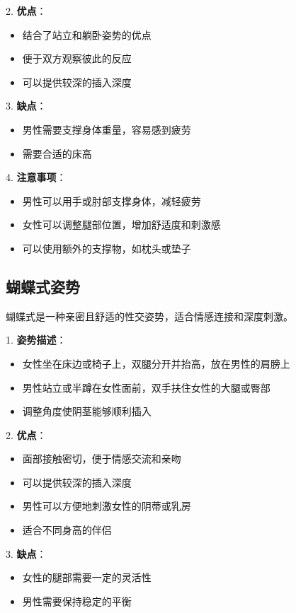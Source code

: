 \documentclass[12pt,UTF8]{ctexbook}
\begin{document}
2. \textbf{优点}：
  \begin{itemize}
  \item 结合了站立和躺卧姿势的优点
  \item 便于双方观察彼此的反应
  \item 可以提供较深的插入深度
  \end{itemize}

3. \textbf{缺点}：
  \begin{itemize}
  \item 男性需要支撑身体重量，容易感到疲劳
  \item 需要合适的床高
  \end{itemize}

4. \textbf{注意事项}：
  \begin{itemize}
  \item 男性可以用手或肘部支撑身体，减轻疲劳
  \item 女性可以调整腿部位置，增加舒适度和刺激感
  \item 可以使用额外的支撑物，如枕头或垫子
  \end{itemize}

\subsection{蝴蝶式姿势}

蝴蝶式是一种亲密且舒适的性交姿势，适合情感连接和深度刺激。

1. \textbf{姿势描述}：
  \begin{itemize}
  \item 女性坐在床边或椅子上，双腿分开并抬高，放在男性的肩膀上
  \item 男性站立或半蹲在女性面前，双手扶住女性的大腿或臀部
  \item 调整角度使阴茎能够顺利插入
  \end{itemize}

2. \textbf{优点}：
  \begin{itemize}
  \item 面部接触密切，便于情感交流和亲吻
  \item 可以提供较深的插入深度
  \item 男性可以方便地刺激女性的阴蒂或乳房
  \item 适合不同身高的伴侣
  \end{itemize}

3. \textbf{缺点}：
  \begin{itemize}
  \item 女性的腿部需要一定的灵活性
  \item 男性需要保持稳定的平衡
  \end{itemize}
\end{document}
